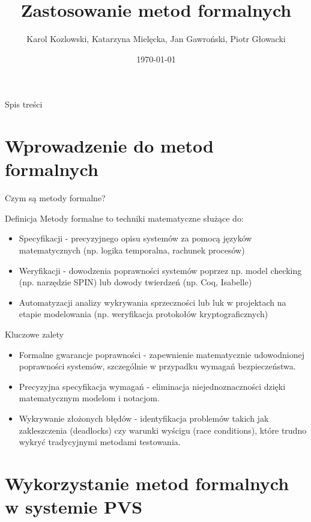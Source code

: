 \documentclass{beamer}
\title{Zastosowanie metod formalnych}
\author{Karol Kozlowski, Katarzyna Mielęcka, Jan Gawroński, Piotr Głowacki}
\institute{Wydzial elektryczny, Politechnika Warszawska}
\date{\today}
\begin{document}
\begin{frame}{}
\titlepage
\end{frame}

\begin{frame}{Spis treści}
\tableofcontents
\end{frame}

\section{Wprowadzenie do metod formalnych}
\begin{frame}{Czym są metody formalne?}
\begin{block}{Definicja}
  Metody formalne to techniki matematyczne służące do:
\begin{itemize}
\item Specyfikacji - precyzyjnego opisu systemów za pomocą języków matematycznych (np. logika temporalna, rachunek procesów)
\item Weryfikacji - dowodzenia poprawności systemów poprzez np. model checking (np. narzędzie SPIN) lub dowody twierdzeń (np. Coq, Isabelle)
\item Automatyzacji analizy  wykrywania sprzeczności lub luk w projektach na etapie modelowania (np. weryfikacja protokołów kryptograficznych)
\end{itemize}
\end{block}
\end{frame}

\begin{frame}
\begin{exampleblock}{Kluczowe zalety}
\begin{itemize}
\item Formalne gwarancje poprawności - zapewnienie matematycznie udowodnionej poprawności systemów, szczególnie w przypadku wymagań bezpieczeństwa.
\item Precyzyjna specyfikacja wymagań - eliminacja niejednoznaczności dzięki matematycznym modelom i notacjom.
\item Wykrywanie złożonych błędów - identyfikacja problemów takich jak zakleszczenia (deadlocks) czy warunki wyścigu (race conditions), które trudno wykryć tradycyjnymi metodami testowania.
\end{itemize}
\end{exampleblock}

\end{frame}

\section{Wykorzystanie metod formalnych w systemie PVS}
\end{document}
